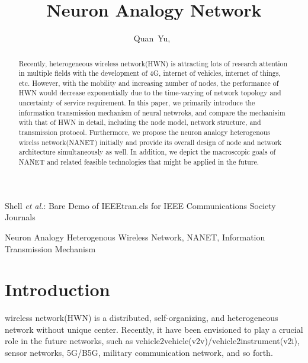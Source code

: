 \documentclass[journal,comsoc]{IEEEtran}
\begin{document}
	
	\title{Neuron Analogy Network}
	
	\author{Quan~Yu,~}	
	{Shell \MakeLowercase{\textit{et al.}}: Bare Demo of IEEEtran.cls for IEEE Communications Society Journals}
	\maketitle
	
	\begin{abstract}
		Recently, heterogeneous wireless network(HWN) is attracting lots of research attention in multiple fields with the development of 4G, internet of vehicles, internet of things, etc. 
		However, with the mobility and increasing number of nodes, the performance of HWN would decrease exponentially due to the time-varying of network topology and uncertainty of service requirement. 
		In this paper, we primarily introduce the information transmission mechanism of neural netwroks, 
		and compare the mechanisim with that of HWN in detail, 
		including the node model, network structure, and transmission protocol. 
		Furthermore, we propose the neuron analogy heterogenous wirelss network(NANET) initially and provide its overall design of node and network architecture simultaneously as well.
		In addition, we depict the macroscopic goals of NANET  and related feasible technologies that might be applied in the future.
	\end{abstract}
	
	\begin{IEEEkeywords}
		Neuron Analogy Heterogenous Wireless Network, NANET, 
		Information Transmission Mechanism
	\end{IEEEkeywords}
	
	\IEEEpeerreviewmaketitle
	
	\section{Introduction}
	\label{section: introduction}
	 wireless network(HWN) is a distributed, self-organizing, and heterogeneous network without unique center.
		Recently, it have been envisioned to play a crucial role in the future networks, 
		such as vehicle2vehicle(v2v)/vehicle2instrument(v2i), sensor networks, 5G/B5G, military communication network, and so forth.
		
\end{document}
